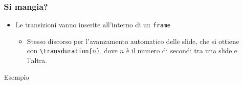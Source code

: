 \begin{frame}
 \frametitle{Si mangia?}
 
 \begin{itemize}
  \item Le transizioni vanno inserite all'interno di un \texttt{frame}
  \begin{itemize}
   \item Stesso discorso per l'avanzamento automatico delle slide, che si 
ottiene con \texttt{\textbackslash transduration\{$n$\}}, dove $n$ è il numero 
di secondi tra una slide e l'altra.
  \end{itemize}
 \end{itemize}
 
 \begin{exampleblock}{Esempio}
    
  \end{exampleblock}


\end{frame}

